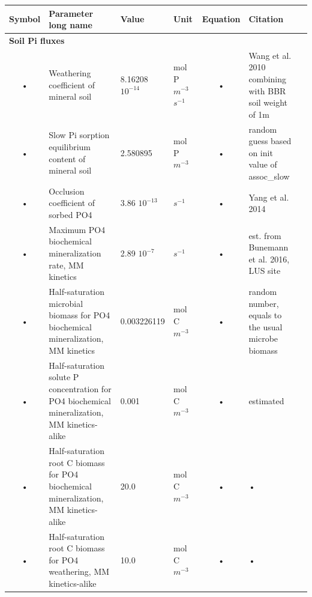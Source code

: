 \documentclass[11pt,oneside,openright,a4paper,fleqn]{book}  %
\begin{document}
\begin{table}
\begin{tabularx}{\linewidth}{|c|X|l|l|c|l|X|} %
\hline 
Symbol & Parameter long name & Value & Unit & Equation & Citation \\
\hline 

\multicolumn{6}{l}{\bf Soil Pi fluxes}\\
\hline
• & Weathering coefficient of mineral soil & 8.16208 $10^{-14}$ & mol P $m^{-3}$ $s^{-1}$ & • & Wang et al. 2010 combining with BBR soil weight of 1m \\
• & Slow Pi sorption equilibrium content of mineral soil & 2.580895 & mol P $m^{-3}$ & • & random guess based on init value of assoc\_slow \\
• & Occlusion coefficient of sorbed PO4 & 3.86 $10^{-13}$ & $s^{-1}$ & • & Yang et al. 2014 \\
• & Maximum PO4 biochemical mineralization rate, MM kinetics & 2.89 $10^{-7}$ & $s^{-1}$ & • & est. from Bunemann et al. 2016, LUS site \\
• & Half-saturation microbial biomass for PO4 biochemical mineralization, MM kinetics & 0.003226119 & mol C $m^{-3}$ & • & random number, equals to the usual microbe biomass \\
• & Half-saturation solute P concentration for PO4 biochemical mineralization, MM kinetics-alike & 0.001 & mol C $m^{-3}$ & • & estimated \\
• & Half-saturation root C biomass for PO4 biochemical mineralization, MM kinetics-alike & 20.0 & mol C $m^{-3}$ & • & • \\
• & Half-saturation root C biomass for PO4 weathering, MM kinetics-alike & 10.0 & mol C $m^{-3}$ & • & • \\

\hline 
\end{tabularx}
\end{table}
\end{document}
